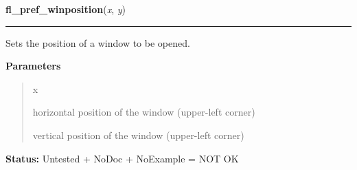 \hspace{.8\funcindent}\begin{boxedminipage}{\funcwidth}

    \raggedright \textbf{fl\_pref\_winposition}(\textit{x}, \textit{y})

    \vspace{-1.5ex}

    \rule{\textwidth}{0.5\fboxrule}
\setlength{\parskip}{2ex}
    Sets the position of a window to be opened.

\setlength{\parskip}{1ex}
      \textbf{Parameters}
      \vspace{-1ex}

      \begin{quote}
        \begin{Ventry}{x}

          \item[x]

          horizontal position of the window (upper-left corner)

          \item[y]

          vertical position of the window (upper-left corner)

        \end{Ventry}

      \end{quote}

\textbf{Status:} Untested + NoDoc + NoExample = NOT OK



    \end{boxedminipage}

    \label{xformslib:library:fl_winbackground}

    \vspace{0.5ex}

